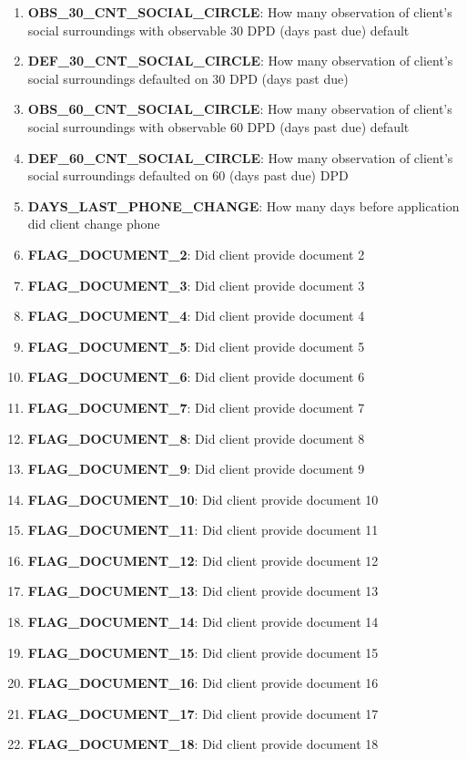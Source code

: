 \documentclass[12pt, letterpaper]{article}
\begin{document}
\begin{appendices}
\begin{enumerate}
  \item \textbf{OBS_30_CNT_SOCIAL_CIRCLE}: How many observation of client's social surroundings with observable 30 DPD (days past due) default
  \item \textbf{DEF_30_CNT_SOCIAL_CIRCLE}: How many observation of client's social surroundings defaulted on 30 DPD (days past due)
  \item \textbf{OBS_60_CNT_SOCIAL_CIRCLE}: How many observation of client's social surroundings with observable 60 DPD (days past due) default
  \item \textbf{DEF_60_CNT_SOCIAL_CIRCLE}: How many observation of client's social surroundings defaulted on 60 (days past due) DPD
  \item \textbf{DAYS_LAST_PHONE_CHANGE}: How many days before application did client change phone
  \item \textbf{FLAG_DOCUMENT_2}: Did client provide document 2
  \item \textbf{FLAG_DOCUMENT_3}: Did client provide document 3
  \item \textbf{FLAG_DOCUMENT_4}: Did client provide document 4
  \item \textbf{FLAG_DOCUMENT_5}: Did client provide document 5
  \item \textbf{FLAG_DOCUMENT_6}: Did client provide document 6
  \item \textbf{FLAG_DOCUMENT_7}: Did client provide document 7
  \item \textbf{FLAG_DOCUMENT_8}: Did client provide document 8
  \item \textbf{FLAG_DOCUMENT_9}: Did client provide document 9
  \item \textbf{FLAG_DOCUMENT_10}: Did client provide document 10
  \item \textbf{FLAG_DOCUMENT_11}: Did client provide document 11
  \item \textbf{FLAG_DOCUMENT_12}: Did client provide document 12
  \item \textbf{FLAG_DOCUMENT_13}: Did client provide document 13
  \item \textbf{FLAG_DOCUMENT_14}: Did client provide document 14
  \item \textbf{FLAG_DOCUMENT_15}: Did client provide document 15
  \item \textbf{FLAG_DOCUMENT_16}: Did client provide document 16
  \item \textbf{FLAG_DOCUMENT_17}: Did client provide document 17
  \item \textbf{FLAG_DOCUMENT_18}: Did client provide document 18

\end{enumerate}
\end{appendices}
\end{document}
